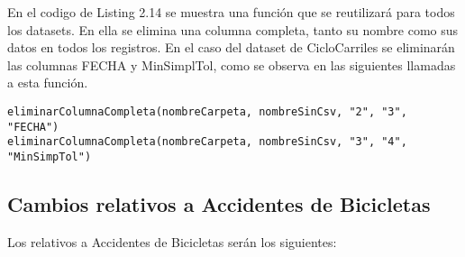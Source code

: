 \begin{itemize}
    
    
    En el codigo de Listing 2.14 se muestra una función que se reutilizará para todos los datasets. En ella se elimina una columna completa, tanto su nombre como sus datos en todos los registros.
\newline En el caso del dataset de CicloCarriles se eliminarán las columnas FECHA y MinSimplTol, como se observa en las siguientes llamadas a esta función.
    
\begin{lstlisting}[style=Python, caption=Llamadas a eliminarColumnaCompleta]
eliminarColumnaCompleta(nombreCarpeta, nombreSinCsv, "2", "3", "FECHA")
eliminarColumnaCompleta(nombreCarpeta, nombreSinCsv, "3", "4", "MinSimpTol")
\end{lstlisting}


\end{itemize}


\clearpage
\subsection{Cambios relativos a Accidentes de Bicicletas}

Los relativos a Accidentes de Bicicletas serán los siguientes:
    
